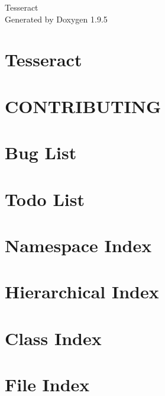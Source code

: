 \documentclass[twoside]{book}
\newcommand{\+}{\discretionary{\mbox{\scriptsize$\hookleftarrow$}}{}{}}
\newcommand{\clearemptydoublepage}{%
    \newpage{\pagestyle{empty}\cleardoublepage}%
  }
\begin{document}
  \raggedbottom
    \hypersetup{pageanchor=false,
                bookmarksnumbered=true,
                pdfencoding=unicode
               }
  \begin{titlepage}
  \vspace*{7cm}
  \begin{center}%
  {\Large Tesseract}\\
  \vspace*{1cm}
  {\large Generated by Doxygen 1.9.5}\\
  \end{center}
  \end{titlepage}
  \clearemptydoublepage
  \tableofcontents
  \clearemptydoublepage
  \hypersetup{pageanchor=true}
\chapter{Tesseract}
\label{index}\hypertarget{index}{}
\chapter{CONTRIBUTING}
\label{md_CONTRIBUTING}

\chapter{Bug List}
\label{bug}

\chapter{Todo List}
\label{todo}

\chapter{Namespace Index}

\chapter{Hierarchical Index}

\chapter{Class Index}

\chapter{File Index}

\end{document}
